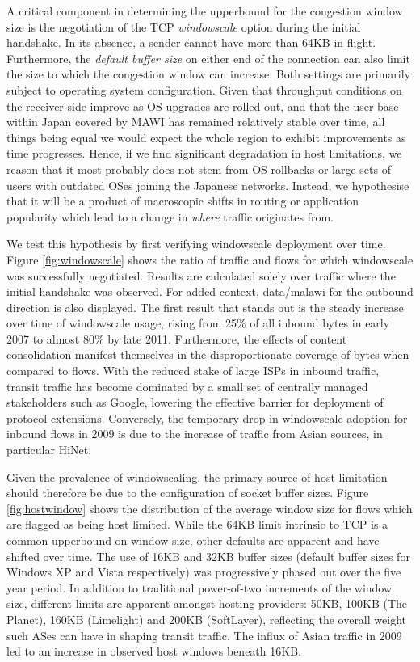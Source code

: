 A critical component in determining the upperbound for the congestion window size is the negotiation of the TCP \emph{windowscale} option during the initial handshake. 
In its absence, a sender cannot have more than 64KB in flight.
Furthermore, the \emph{default buffer size} on either end of the connection can also limit the size to which the congestion window can increase.
Both settings are primarily subject to operating system configuration.
Given that throughput conditions on the receiver side improve as OS upgrades are rolled out, and that the user base within Japan covered by MAWI has remained relatively stable over time, all things being equal we would expect the whole region to exhibit improvements as time progresses. Hence, if we find significant degradation in host limitations, we reason that it most probably does not stem from OS rollbacks or large sets of users with outdated OSes joining the Japanese networks. Instead, we hypothesise that it will be a product of macroscopic shifts in routing or application popularity which lead to a change in \emph{where} traffic originates from.

We test this hypothesis by first verifying windowscale deployment over time.
Figure \ref{fig:windowscale} shows the ratio of traffic and flows for which windowscale was successfully negotiated.
Results are calculated solely over traffic where the initial handshake was observed.
For added context, data/malawi for the outbound direction is also displayed.
The first result that stands out is the steady increase over time of windowscale usage, rising from 25\% of all inbound bytes in early 2007 to almost 80\% by late 2011.
Furthermore, the effects of content consolidation manifest themselves in the disproportionate coverage of bytes when compared to flows.
With the reduced stake of large ISPs in inbound traffic, transit traffic has become dominated by a small set of centrally managed stakeholders such as Google, lowering the effective barrier for deployment of protocol extensions.
Conversely, the temporary drop in windowscale adoption for inbound flows in 2009 is due to the increase of traffic from Asian sources, in particular HiNet.

Given the prevalence of windowscaling, the primary source of host limitation should therefore be due to the configuration of socket buffer sizes.
Figure \ref{fig:hostwindow} shows the distribution of the average window size for flows which are flagged as being host limited.
While the 64KB limit intrinsic to TCP is a common upperbound on window size, other defaults are apparent and have shifted over time.
The use of 16KB and 32KB buffer sizes (default buffer sizes for Windows XP and Vista respectively) was progressively phased out over the five year period.
In addition to traditional power-of-two increments of the window size, different limits are apparent amongst hosting providers: 50KB, 100KB (The Planet), 160KB (Limelight) and 200KB (SoftLayer), reflecting the overall weight such ASes can have in shaping transit traffic.
The influx of Asian traffic in 2009 led to an increase in observed host windows beneath 16KB.


